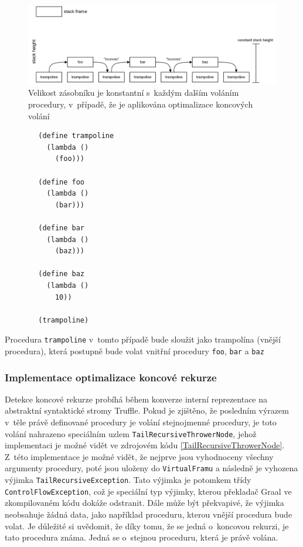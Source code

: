 \documentclass[
  master,
  biblatex,
  figures=true,
  theorems,
  sourcecodes,
  glossaries,
  index
]{kidiplom}
\begin{document}
\begin{figure} [h]
    \centering
    \includegraphics[width= 1\textwidth]{images/trampoline-bounce.png}
    \caption{Velikost zásobníku je konstantní s~každým dalším voláním procedury, v~případě, že je aplikována optimalizace koncových volání \cite{truffle-clojure}}
    \label{fig:constant-stack-height}
\end{figure}

\begin{listing} 
    \begin{verbatim}
        (define trampoline
          (lambda ()
            (foo)))
        
        (define foo
          (lambda ()
            (bar)))
        
        (define bar
          (lambda ()
            (baz)))
        
        (define baz
          (lambda ()
            10))
        
        (trampoline)
    \end{verbatim}
    \caption{Procedura \texttt{trampoline} v~tomto případě bude sloužit jako trampolína (vnější procedura), která postupně bude volat vnitřní procedury \texttt{foo}, \texttt{bar} a \texttt{baz}}
    \label{tail-call-example}
\end{listing}



\subsubsection{Implementace optimalizace koncové rekurze}
Detekce koncové rekurze probíhá během konverze interní reprezentace na abstraktní syntaktické stromy Truffle. Pokud je zjištěno, že posledním výrazem v~těle právě definované procedury je volání stejnojmenné procedury, je toto volání nahrazeno speciálním uzlem \texttt{TailRecursiveThrowerNode}, jehož implementaci je možné vidět ve zdrojovém kódu \ref{TailRecursiveThrowerNode}. Z~této implementace je možné vidět, že nejprve jsou vyhodnoceny všechny argumenty procedury, poté jsou uloženy do \texttt{VirtualFramu} a následně je vyhozena výjimka \texttt{TailRecursiveException}. Tato výjimka je potomkem třídy \texttt{ControlFlowException}, což je speciální typ výjimky, kterou překladač Graal ve zkompilovaném kódu dokáže odstranit. Dále může být překvapivé, že výjimka neobsahuje žádná data, jako například proceduru, kterou vnější procedura bude volat. Je důležité si uvědomit, že díky tomu, že se jedná o~koncovou rekurzi, je tato procedura známa. Jedná se o~stejnou proceduru, která je právě volána.
\end{document}
